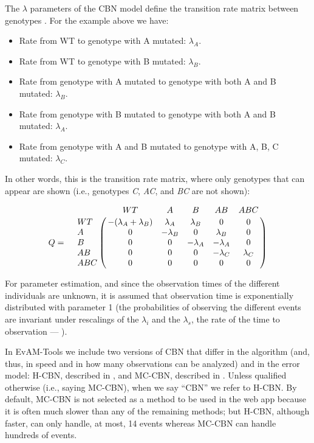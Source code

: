 \documentclass[a4paper,11pt]{article}
\begin{document}
The $\lambda$ parameters of the CBN model define the transition rate matrix between genotypes \citep[see also][]{montazeri2016large}. For the example above we have:
\begin{itemize}
\item Rate from WT to genotype with A mutated: $\lambda_A$.
\item Rate from WT to genotype with B mutated: $\lambda_B$.
\item Rate from genotype with A mutated to genotype with both A and B mutated: $\lambda_B$.
\item Rate from genotype with B mutated to genotype with both A and B mutated: $\lambda_A$.
\item Rate from genotype with A and B mutated to genotype with A, B, C mutated: $\lambda_C$. 
\end{itemize}


In other words, this is the transition rate matrix, where only genotypes that can appear are shown (i.e., genotypes \textit{C}, \textit{AC}, and \textit{BC} are not shown):


\begin{equation}\label{eq:ratecbn}
  Q = \quad \bordermatrix{
    & WT & A & B & AB & ABC \cr
    WT  & -(\lambda_A + \lambda_B) & \lambda_A & \lambda_B & 0 & 0 \cr
    A   & 0 & -\lambda_B & 0 & \lambda_B & 0 \cr
    B   & 0 & 0 & -\lambda_A & -\lambda_A & 0 \cr
    AB  & 0 & 0 & 0 & -\lambda_C & \lambda_C \cr
    ABC & 0 & 0 & 0 & 0 & 0 \cr
  }
\end{equation}




For parameter estimation, and since the observation times of the different individuals are unknown, it is assumed that observation time is exponentially distributed with parameter 1 (the probabilities of observing the different events are invariant under rescalings of the $\lambda_i$ and the $\lambda_s$, the rate of the time to observation --- \citealp{gerstung2009quantifying}).

In EvAM-Tools we include two versions of CBN that differ in the algorithm (and, thus, in speed and in how many observations can be analyzed) and in the error model: H-CBN, described in \citet{gerstung2009quantifying, gerstung2011temporal}, and MC-CBN, described in \citet{montazeri2016large}. Unless qualified otherwise (i.e., saying MC-CBN), when we say ``CBN'' we refer to H-CBN. By default, MC-CBN is not selected as a method to be used in the web app because it is often much slower than any of the remaining methods; but H-CBN, although faster, can only handle, at most, 14 events whereas MC-CBN can handle hundreds of events. 
\end{document}
